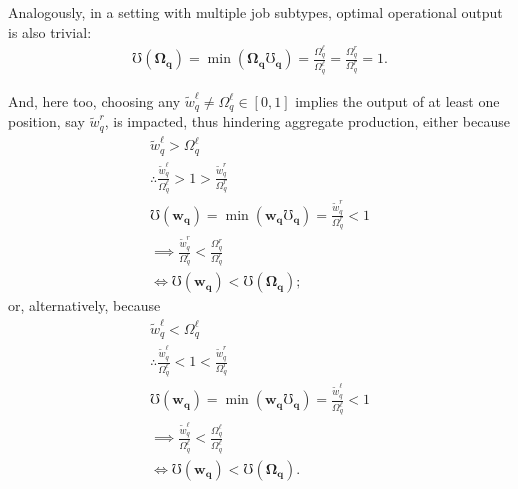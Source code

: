 \documentclass[hidelinks, nonatbib]{elsarticle}
\begin{document}
\begin{enumerate}
    Analogously, in a setting with multiple job subtypes, optimal operational output is also trivial:
    \begin{align}
        \mho(\boldsymbol{\Omega_q})
        = 
        \min(
            \boldsymbol{\Omega_q}
            \boldsymbol{\mho_q}
        )
        =
        \frac{
            \Omega_{q}^{\ell}
        }{
            \Omega_{q}^{\ell}
        }
        =
        \frac{
            \Omega_{q}^{r}
        }{
            \Omega_{q}^{r}
        }
        =
        1
        .
    \end{align}

    And, here too, choosing any $\tilde{w}_{q}^{\ell} \neq \Omega_{q}^{\ell} \in [0,1]$ implies the output of at least one position, say $\tilde{w}_{q}^{r}$, is impacted, thus hindering aggregate production, either because
    \begin{align}
        \tilde{w}_{q}^{\ell} > \Omega_{q}^{\ell}
        \\
        \therefore
        \frac{
            \tilde{w}_{q}^{\ell}
        }{
            \Omega_{q}^{\ell}
        }
        > 
        1
        > 
        \frac{
            \tilde{w}_{q}^{r}
        }{
            \Omega_{q}^{r}
        }
        \\
        \mho(\boldsymbol{w_q})
        = 
        \min(
            \boldsymbol{w_q}
            \boldsymbol{\mho_q}
        )
        =
        \frac{
            \tilde{w}_{q}^{r}
        }{
            \Omega_{q}^{r}
        }
        < 
        1
        \\
        \implies
        \frac{
            \tilde{w}_{q}^{r}
        }{
            \Omega_{q}^{r}
        }
        <
        \frac{
            \Omega_{q}^{r}
        }{
            \Omega_{q}^{r}
        }
        \\
        \iff
        \mho(\boldsymbol{w_q})
        <
        \mho(\boldsymbol{\Omega_q})
        ;
    \end{align}
    or, alternatively, because
    \begin{align}
        \tilde{w}_{q}^{\ell} < \Omega_{q}^{\ell}
        \\
        \therefore
        \frac{
            \tilde{w}_{q}^{\ell}
        }{
            \Omega_{q}^{\ell}
        }
        < 
        1
        < 
        \frac{
            \tilde{w}_{q}^{r}
        }{
            \Omega_{q}^{r}
        }
        \\
        \mho(\boldsymbol{w_q})
        = 
        \min(
            \boldsymbol{w_q}
            \boldsymbol{\mho_q}
        )
        =
        \frac{
            \tilde{w}_{q}^{\ell}
        }{
            \Omega_{q}^{\ell}
        }
        < 
        1
        \\
        \implies
        \frac{
            \tilde{w}_{q}^{\ell}
        }{
            \Omega_{q}^{\ell}
        }
        <
        \frac{
            \Omega_{q}^{\ell}
        }{
            \Omega_{q}^{\ell}
        }
        \\
        \iff
        \mho(\boldsymbol{w_q})
        <
        \mho(\boldsymbol{\Omega_q})
        .
    \end{align}


\end{enumerate}
\end{document}

